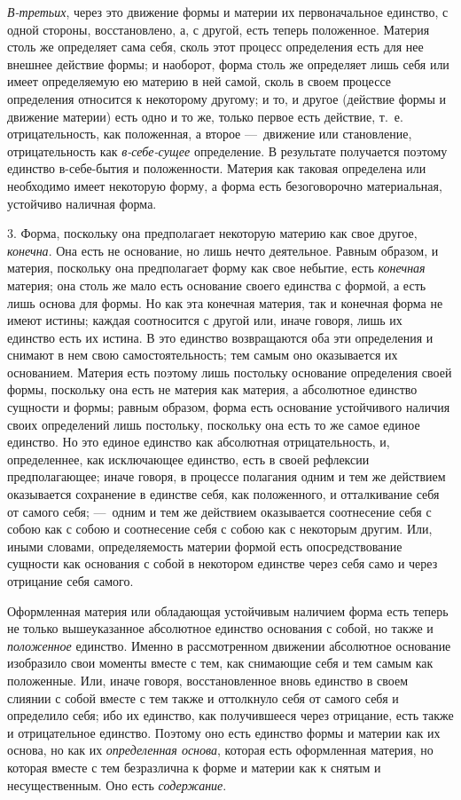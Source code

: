 {\em В-третьих}, через это движение формы и материи их
первоначальное единство, с одной стороны, восстановлено, а, с другой, есть
теперь положенное. Материя столь же определяет сама себя, сколь этот
процесс определения есть для нее внешнее действие формы; и наоборот, форма
столь же определяет лишь себя или имеет определяемую ею материю в ней
самой, сколь в своем процессе определения относится к некоторому другому; и
то, и другое (действие формы и движение материи) есть одно и то же, только
первое есть действие, т.~е. отрицательность, как положенная, а второе
—~движение или становление, отрицательность как
{\em в-себе-сущее} определение. В результате получается
поэтому единство в-себе-бытия и положенности. Материя как таковая
определена или необходимо имеет некоторую форму, а форма есть безоговорочно
материальная, устойчиво наличная форма.

3. Форма, поскольку она предполагает некоторую материю как свое другое,
{\em конечна}. Она есть не основание, но лишь нечто
деятельное. Равным образом, и материя, поскольку она предполагает форму как
свое небытие, есть {\em конечная} материя; она столь же
мало есть основание своего единства с формой, а есть лишь основа для формы.
Но как эта конечная материя, так и конечная форма не имеют истины; каждая
соотносится с другой или, иначе говоря, лишь их единство есть их истина. В
это единство возвращаются оба эти определения и снимают в нем свою
самостоятельность; тем самым оно оказывается их основанием. Материя есть
поэтому лишь постольку основание определения своей формы, поскольку она
есть не материя как материя, а абсолютное единство сущности и формы; равным
образом, форма есть основание устойчивого наличия своих определений лишь
постольку, поскольку она есть то же самое единое единство. Но это единое
единство как абсолютная отрицательность, и, определеннее, как исключающее
единство, есть в своей рефлексии предполагающее; иначе говоря, в процессе
полагания одним и тем же действием оказывается сохранение в единстве себя,
как положенного, и отталкивание себя от самого себя; —~одним и тем же
действием оказывается соотнесение себя с собою как с собою и соотнесение
себя с собою как с некоторым другим. Или, иными словами, определяемость
материи формой есть опосредствование сущности как основания с собой в
некотором единстве через себя само и через отрицание себя самого.

Оформленная материя или обладающая устойчивым наличием форма есть теперь не
только вышеуказанное абсолютное единство основания с собой, но также и
{\em положенное} единство. Именно в рассмотренном
движении абсолютное основание изобразило свои моменты вместе с тем, как
снимающие себя и тем самым как положенные. Или, иначе говоря,
восстановленное вновь единство в своем слиянии с собой вместе с тем также и
оттолкнуло себя от самого себя и определило себя; ибо их единство, как
получившееся через отрицание, есть также и отрицательное единство. Поэтому
оно есть единство формы и материи как их основа, но как их
{\em определенная основа}, которая есть оформленная
материя, но которая вместе с тем безразлична к форме и материи как к снятым
и несущественным. Оно есть {\em содержание}.

